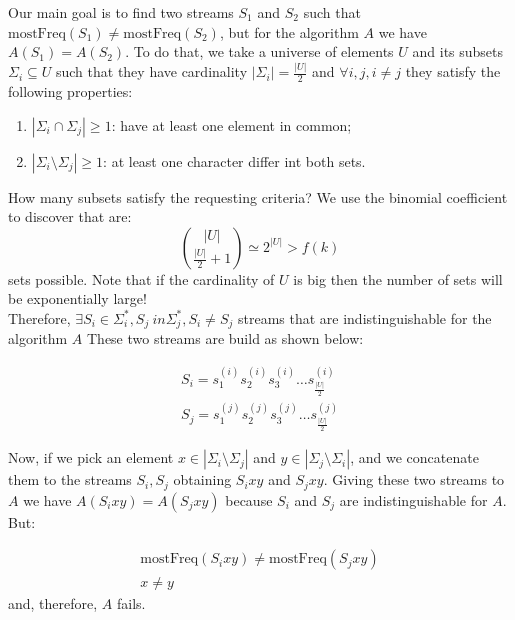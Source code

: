 \documentclass{article}
\begin{document}
Our main goal is to find two streams $S_1$ and $S_2$ such that $\textrm{mostFreq}(S_1) \ne \textrm{mostFreq}(S_2)$, 
but for the algorithm $A$ we have $A(S_1) = A(S_2)$. To do that, we take a universe of elements $U$ and its subsets $\Sigma_i \subseteq U$ such
that they have cardinality $|\Sigma_i| = \frac{|U|}{2}$ and $\forall i, j, i \ne j$ they satisfy the following properties:
\begin{enumerate}
    \item $|\Sigma_i \cap \Sigma_j| \ge 1$: have at least one element in common;
    \item $|\Sigma_i \setminus \Sigma_j| \ge 1$: at least one character differ int both sets.
\end{enumerate}

\noindent How many subsets satisfy the requesting criteria? We use the binomial coefficient to discover that are:
\begin{equation}
    \binom{|U|}{\frac{|U|}{2} + 1} \simeq 2^{|U|} > f(k)
\end{equation}
sets possible. Note that if the cardinality of $U$ is big then the number of sets will be exponentially large!\\

\noindent Therefore, $\exists S_i \in \Sigma_{i}^*, S_j \ in \Sigma_{j}^{*}, S_i \ne S_j$ streams that are indistinguishable for the algorithm $A$
These two streams are build as shown below:

\begin{align}
S_i = s_1^{(i)}s_2^{(i)}s_3^{(i)} \dots s_{\frac{|U|}{2}}^{(i)} \\
S_j = s_1^{(j)}s_2^{(j)}s_3^{(j)} \dots s_{\frac{|U|}{2}}^{(j)}
\end{align}

\noindent Now, if we pick an element $x \in |\Sigma_i \setminus \Sigma_j|$ and $y \in |\Sigma_j \setminus \Sigma_i|$, and we concatenate them to 
the streams $S_i, S_j$ obtaining $S_ixy$ and $S_jxy$. Giving these two streams to $A$ we have $A(S_i xy) = A(S_j xy)$ because $S_i$ and $S_j$ are
indistinguishable for $A$. But:

\begin{align*}
    \textrm{mostFreq}(S_i xy) \ne \textrm{mostFreq}(S_j xy) \\
    x \ne y
\end{align*}
and, therefore, $A$ fails.
\end{document}

